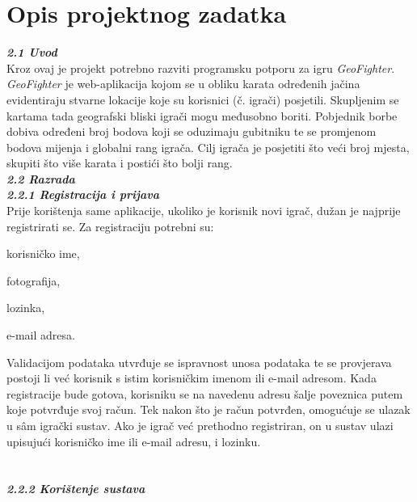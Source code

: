 \chapter{Opis projektnog zadatka}
		
		\textbf{\textit{\large 2.1 Uvod}}\\
		
		{Kroz ovaj je projekt potrebno razviti programsku potporu za igru  \emph{GeoFighter}. \emph{GeoFighter} je web-aplikacija kojom se u obliku karata određenih jačina evidentiraju stvarne lokacije koje su korisnici (č. igrači) posjetili. Skupljenim se kartama tada geografski bliski igrači mogu međusobno boriti. Pobjednik borbe dobiva određeni broj bodova koji se oduzimaju gubitniku te se promjenom bodova mijenja i globalni rang igrača. Cilj igrača je posjetiti što veći broj mjesta, skupiti što više karata i postići što bolji rang. } \\
		
		
		\textbf{\textit{\large 2.2 Razrada }}\\ 
		
		\textbf{\textit{2.2.1 Registracija i prijava }}\\
		
		{Prije korištenja same aplikacije, ukoliko je korisnik novi igrač, dužan je najprije registrirati se. Za registraciju potrebni su:}
	
		\begin{packed_item}
			\item {korisničko ime,}
			\item {fotografija,}
			\item {lozinka,}
			\item {e-mail adresa.}
		\end{packed_item}
		
		{Validacijom podataka utvrđuje se ispravnost unosa podataka te se provjerava postoji li već korisnik s istim korisničkim imenom ili e-mail adresom. Kada registracije bude gotova, korisniku se na navedenu adresu šalje poveznica putem koje potvrđuje svoj račun. Tek nakon što je račun potvrđen, omogućuje se ulazak u sâm igrački sustav.}
		{Ako je igrač već prethodno registriran, on u sustav ulazi upisujući korisničko ime ili e-mail adresu, i lozinku.}\\ \\ \\
		
		\textbf{\textit{2.2.2 Korištenje sustava}}\\
		
